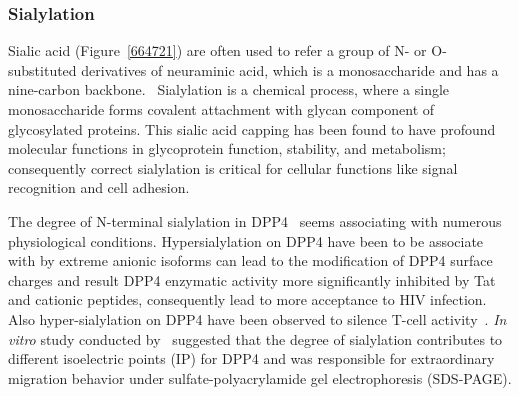 \subsubsection {Sialylation}
Sialic acid (Figure~\ref{664721}) are often used to refer a group of N- or O-substituted derivatives of neuraminic acid, which is a monosaccharide and has a nine-carbon backbone.~\cite{Vocadlo_2009} Sialylation is a chemical process, where a single monosaccharide forms covalent attachment with glycan component of glycosylated proteins. This sialic acid capping has been found to have profound molecular functions in glycoprotein function, stability, and metabolism; consequently correct sialylation is critical for cellular functions like signal recognition and cell adhesion.~\cite{Bhide_2016}
\par 
The degree of N-terminal sialylation in DPP4~\cite{Stehling_1999} seems associating with numerous physiological conditions. Hypersialylation on DPP4 have been  to be associate with by extreme anionic isoforms can lead to the modification of DPP4 surface charges and result DPP4 enzymatic activity more significantly inhibited by Tat and cationic peptides, consequently lead to more acceptance to HIV infection.~\cite{SMITH_1998} Also hyper-sialylation on DPP4 have been observed to silence T-cell activity~\cite{Cuchacovich2001}.  \cite{K_hne_1996} 
\textit{In vitro} study conducted by~\citet{Schmauser1999} suggested that the degree of sialylation contributes to different isoelectric points (IP) for DPP4 and was responsible for extraordinary migration behavior under sulfate-polyacrylamide gel electrophoresis (SDS-PAGE).